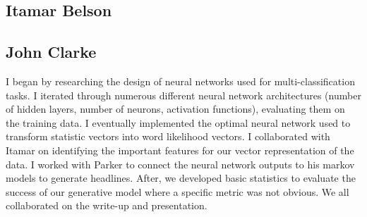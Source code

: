 \documentclass[12pt, journal]{IEEEtran}
\begin{document}
\subsection{Itamar Belson}

\subsection{John Clarke}
I began by researching the design of neural networks used for multi-classification tasks. I iterated through numerous different neural network architectures (number of hidden layers, number of neurons, activation functions), evaluating them on the training data. I eventually implemented the optimal neural network used to transform statistic vectors into word likelihood vectors. I collaborated with Itamar on identifying the important features for our vector representation of the data. I worked with Parker to connect the neural network outputs to his markov models to generate headlines. After, we developed basic statistics to evaluate the success of our generative model where a specific metric was not obvious. We all collaborated on the write-up and presentation. 




%
%
\end{document}
